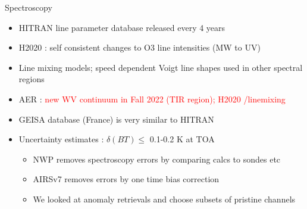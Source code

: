 \documentclass[10pt,t]{beamer}
\begin{document}
\begin{frame}[shrink=2]{Spectroscopy}
\vspace{-0.1in}

\begin{itemize}
  \item HITRAN line parameter database released every 4 years
  \item H2020 : self consistent changes to O3 line intensities (MW to UV) %
  \item Line mixing models; speed dependent Voigt line shapes used in other spectral regions
  \item AER : \textcolor{red}{new WV continuum in Fall 2022 (TIR region); H2020 \cd/\methane linemixing}
  \item GEISA database (France) is very similar to HITRAN
  \item Uncertainty estimates : $\delta(BT) \le$ 0.1-0.2 K at TOA  
  \begin{itemize}    
    \item NWP removes spectroscopy errors by comparing calcs to sondes etc
    \item AIRSv7 removes errors by one time bias correction
    \item We looked at anomaly retrievals and choose subsets of pristine channels
  \end{itemize}
\end{itemize}
\end{frame}

\end{document}
